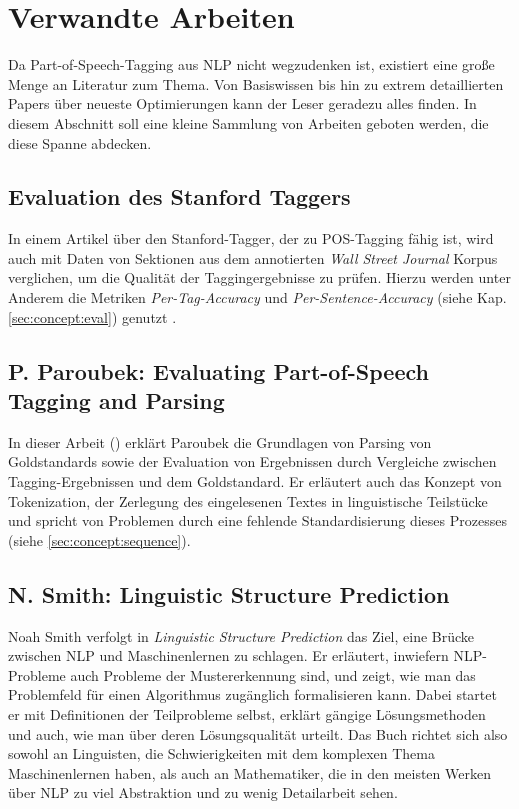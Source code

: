 \section{Verwandte Arbeiten}
\label{sec:related:r}

Da Part-of-Speech-Tagging aus NLP nicht wegzudenken ist, existiert eine große Menge an Literatur zum Thema. Von Basiswissen bis hin zu extrem detaillierten Papers über neueste Optimierungen kann der Leser geradezu alles finden. In diesem Abschnitt soll eine kleine Sammlung von Arbeiten geboten werden, die diese Spanne abdecken.

\subsection{Evaluation des Stanford Taggers}
\label{sec:related:r:stanford}
In einem Artikel über den Stanford-Tagger, der zu POS-Tagging fähig ist, wird auch mit Daten von Sektionen aus dem annotierten \textit{Wall Street Journal} Korpus verglichen, um die Qualität der Taggingergebnisse zu prüfen. Hierzu werden unter Anderem die Metriken \textit{Per-Tag-Accuracy} und \textit{Per-Sentence-Accuracy} (siehe Kap. \ref{sec:concept:eval}) genutzt \cite{Paper:StanfordTagger}.

\subsection{P. Paroubek: Evaluating Part-of-Speech Tagging and Parsing}

In dieser Arbeit (\cite{paroubek}) erklärt Paroubek die Grundlagen von Parsing von Goldstandards sowie der Evaluation von Ergebnissen durch Vergleiche zwischen Tagging-Ergebnissen und dem Goldstandard. Er erläutert auch das Konzept von Tokenization, der Zerlegung des eingelesenen Textes in linguistische Teilstücke und spricht von Problemen durch eine fehlende Standardisierung dieses Prozesses (siehe \ref{sec:concept:sequence}).

\subsection{N. Smith: Linguistic Structure Prediction}

Noah Smith verfolgt in \textit{Linguistic Structure Prediction} \cite{Smith} das Ziel, eine Brücke zwischen NLP und Maschinenlernen zu schlagen. Er erläutert, inwiefern NLP-Probleme auch Probleme der Mustererkennung sind, und zeigt, wie man das Problemfeld für einen Algorithmus zugänglich formalisieren kann. Dabei startet er mit Definitionen der Teilprobleme selbst, erklärt gängige Lösungsmethoden und auch, wie man über deren Lösungsqualität urteilt. Das Buch richtet sich also sowohl an Linguisten, die Schwierigkeiten mit dem komplexen Thema Maschinenlernen haben, als auch an Mathematiker, die in den meisten Werken über NLP zu viel Abstraktion und zu wenig Detailarbeit sehen.



